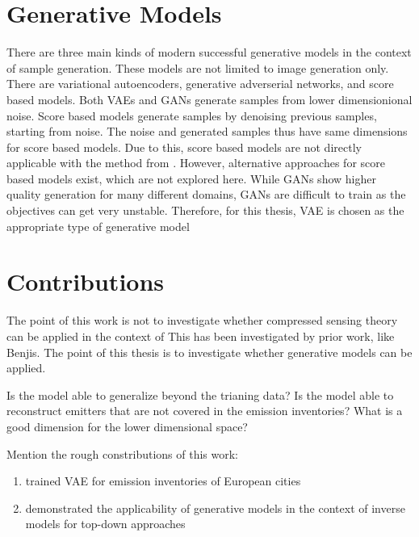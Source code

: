\section{Generative Models}
There are three main kinds of modern successful generative models in the context of sample generation.
These models are not limited to image generation only.
There are variational autoencoders, generative adverserial networks, and score based models.
Both VAEs and GANs generate samples from lower dimensionional noise.
Score based models generate samples by denoising previous samples, starting from noise.
The noise and generated samples thus have same dimensions for score based models.
Due to this, score based models are not directly applicable with the method from \parencite{CSUsingAI}.
However, alternative approaches for score based models exist, which are not explored here.
While GANs show higher quality generation for many different domains, GANs are difficult to train as the objectives can get very unstable.
Therefore, for this thesis, VAE is chosen as the appropriate type of generative model

\section{Contributions}
The point of this work is not to investigate whether compressed sensing theory can be applied in the context of 
This has been investigated by prior work, like Benjis.
The point of this thesis is to investigate whether generative models can be applied.

Is the model able to generalize beyond the trianing data?
Is the model able to reconstruct emitters that are not covered in the emission inventories? 
What is a good dimension for the lower dimensional space?

Mention the rough constributions of this work:
\begin{enumerate}
    \item trained VAE for emission inventories of European cities
    \item demonstrated the applicability of generative models in the context of inverse models for top-down approaches
\end{enumerate}
